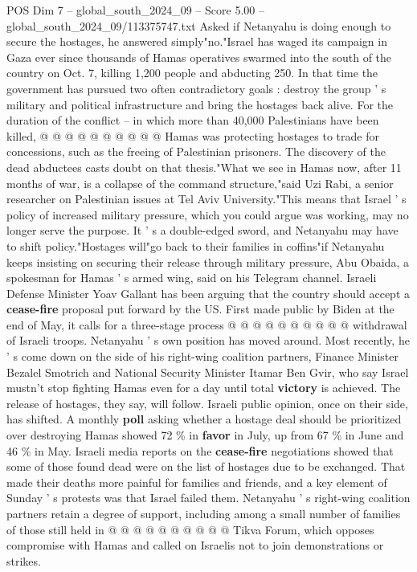 \begin{textsample}{POS Dim 7 – global\_south\_2024\_09 – Score 5.00 – global\_south\_2024\_09/113375747.txt}
Asked if Netanyahu is doing enough to secure the hostages, he answered simply"no."Israel has waged its campaign in Gaza ever since thousands of Hamas operatives swarmed into the south of the country on Oct. 7, killing 1,200 people and abducting 250.
In that time the government has pursued two often contradictory goals : destroy the group ' s military and political infrastructure and bring the hostages back alive.
For the duration of the conflict -- in which more than 40,000 Palestinians have been killed, @ @ @ @ @ @ @ @ @ @ Hamas was protecting hostages to trade for concessions, such as the freeing of Palestinian prisoners.
The discovery of the dead abductees casts doubt on that thesis."What we see in Hamas now, after 11 months of war, is a collapse of the command structure,"said Uzi Rabi, a senior researcher on Palestinian issues at Tel Aviv University."This means that Israel ' s policy of increased military pressure, which you could argue was working, may no longer serve the purpose.
It ' s a double-edged sword, and Netanyahu may have to shift policy."Hostages will"go back to their families in coffins"if Netanyahu keeps insisting on securing their release through military pressure, Abu Obaida, a spokesman for Hamas ' s armed wing, said on his Telegram channel.
Israeli Defense Minister Yoav Gallant has been arguing that the country should accept a \textbf{cease-fire} proposal put forward by the US.
First made public by Biden at the end of May, it calls for a three-stage process @ @ @ @ @ @ @ @ @ @ withdrawal of Israeli troops.
Netanyahu ' s own position has moved around.
Most recently, he ' s come down on the side of his right-wing coalition partners, Finance Minister Bezalel Smotrich and National Security Minister Itamar Ben Gvir, who say Israel mustn't stop fighting Hamas even for a day until total \textbf{victory} is achieved.
The release of hostages, they say, will follow.
Israeli public opinion, once on their side, has shifted.
A monthly \textbf{poll} asking whether a hostage deal should be prioritized over destroying Hamas showed 72 \% in \textbf{favor} in July, up from 67 \% in June and 46 \% in May.
Israeli media reports on the \textbf{cease-fire} negotiations showed that some of those found dead were on the list of hostages due to be exchanged.
That made their deaths more painful for families and friends, and a key element of Sunday ' s protests was that Israel failed them.
Netanyahu ' s right-wing coalition partners retain a degree of support, including among a small number of families of those still held in @ @ @ @ @ @ @ @ @ @ Tikva Forum, which opposes compromise with Hamas and called on Israelis not to join demonstrations or strikes.

\end{textsample}

